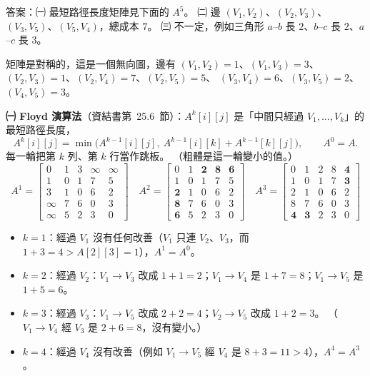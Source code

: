 \begin{pastsoln}
答案：㈠ 最短路徑長度矩陣見下面的 $A^{5}$。 ㈡ 邊 $(V_1,V_2)$、$(V_2,V_3)$、$(V_3,V_5)$、$(V_5,V_4)$，總成本 $7$。
㈢ 不一定，例如三角形 $a$--$b$ 長 $2$、$b$--$c$ 長 $2$、$a$--$c$ 長 $3$。

矩陣是對稱的，這是一個無向圖，邊有 $(V_1,V_2)=1$、$(V_1,V_3)=3$、$(V_2,V_3)=1$、$(V_2,V_4)=7$、$(V_2,V_5)=5$、
$(V_3,V_4)=6$、$(V_3,V_5)=2$、$(V_4,V_5)=3$。

\textbf{㈠ Floyd 演算法}（資結書第~25.6~節）：$A^{k}[i][j]$ 是「中間只經過 $V_1, \ldots, V_k$」的最短路徑長度，
\[
A^{k}[i][j] = \min\bigl(A^{k-1}[i][j],\ A^{k-1}[i][k] + A^{k-1}[k][j]\bigr), \qquad A^{0} = A .
\]
每一輪把第 $k$ 列、第 $k$ 行當作跳板。 （粗體是這一輪變小的值。）
\[
A^{1} = \begin{bmatrix}
0 & 1 & 3 & \infty & \infty \\
1 & 0 & 1 & 7 & 5 \\
3 & 1 & 0 & 6 & 2 \\
\infty & 7 & 6 & 0 & 3 \\
\infty & 5 & 2 & 3 & 0
\end{bmatrix}
\quad
A^{2} = \begin{bmatrix}
0 & 1 & \mathbf{2} & \mathbf{8} & \mathbf{6} \\
1 & 0 & 1 & 7 & 5 \\
\mathbf{2} & 1 & 0 & 6 & 2 \\
\mathbf{8} & 7 & 6 & 0 & 3 \\
\mathbf{6} & 5 & 2 & 3 & 0
\end{bmatrix}
\quad
A^{3} = \begin{bmatrix}
0 & 1 & 2 & 8 & \mathbf{4} \\
1 & 0 & 1 & 7 & \mathbf{3} \\
2 & 1 & 0 & 6 & 2 \\
8 & 7 & 6 & 0 & 3 \\
\mathbf{4} & \mathbf{3} & 2 & 3 & 0
\end{bmatrix}
\]
\begin{itemize}
\item $k = 1$：經過 $V_1$ 沒有任何改善（$V_1$ 只連 $V_2$、$V_3$，而 $1 + 3 = 4 > A[2][3] = 1$），$A^{1} = A^{0}$。
\item $k = 2$：經過 $V_2$：$V_1 \to V_3$ 改成 $1 + 1 = 2$；$V_1 \to V_4$ 是 $1 + 7 = 8$；$V_1 \to V_5$ 是 $1 + 5 = 6$。
\item $k = 3$：經過 $V_3$：$V_1 \to V_5$ 改成 $2 + 2 = 4$；$V_2 \to V_5$ 改成 $1 + 2 = 3$。 （$V_1 \to V_4$ 經 $V_3$ 是
$2 + 6 = 8$，沒有變小。）
\item $k = 4$：經過 $V_4$ 沒有改善（例如 $V_1 \to V_5$ 經 $V_4$ 是 $8 + 3 = 11 > 4$），$A^{4} = A^{3}$。

\end{itemize}
\end{pastsoln}
